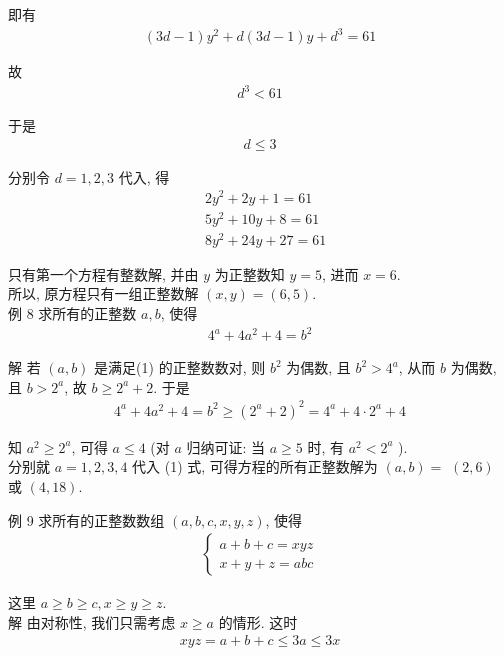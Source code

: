 即有
\begin{align*}
	(3 d-1) y^{2}+d(3 d-1) y+d^{3}=61
\end{align*}

故
\begin{align*}
	d^{3}<61
\end{align*}

于是
\begin{align*}
	d \leqslant 3
\end{align*}

分别令 $d=1 ,  2 ,  3$ 代入, 得\begin{align}
	 & 2 y^{2}+2 y+1=61   \\
	 & 5 y^{2}+10 y+8=61  \\
	 & 8 y^{2}+24 y+27=61
\end{align}

只有第一个方程有整数解, 并由 $y$ 为正整数知 $y=5$, 进而 $x=6$.\\
所以, 原方程只有一组正整数解 $(x, y)=(6,5)$.\\
例 8 求所有的正整数 $a ,  b$, 使得
\begin{align*}
	4^{a}+4 a^{2}+4=b^{2}
\end{align*}

解 若 $(a ,  b)$ 是满足(1) 的正整数数对, 则 $b^{2}$ 为偶数, 且 $b^{2}>4^{a}$, 从而 $b$ 为偶数, 且 $b>2^{a}$, 故 $b \geqslant 2^{a}+2$. 于是
\begin{align*}
	4^{a}+4 a^{2}+4=b^{2} \geqslant\left(2^{a}+2\right)^{2}=4^{a}+4 \cdot 2^{a}+4
\end{align*}

知 $a^{2} \geqslant 2^{a}$, 可得 $a \leqslant 4$ (对 $a$ 归纳可证: 当 $a \geqslant 5$ 时, 有 $a^{2}<2^{a}$ ).\\
分别就 $a=1,2,3,4$ 代入 (1) 式, 可得方程的所有正整数解为 $(a, b)=$ $(2,6)$ 或 $(4,18)$.

例 9 求所有的正整数数组 $(a, b, c, x, y, z)$, 使得
\begin{align*}
	\left\{\begin{array}{l}
		       a+b+c=x y z \\
		       x+y+z=a b c
	       \end{array}\right.
\end{align*}

这里 $a \geqslant b \geqslant c, x \geqslant y \geqslant z$.\\
解 由对称性, 我们只需考虑 $x \geqslant a$ 的情形. 这时
\begin{align*}
	x y z=a+b+c \leqslant 3 a \leqslant 3 x
\end{align*}

